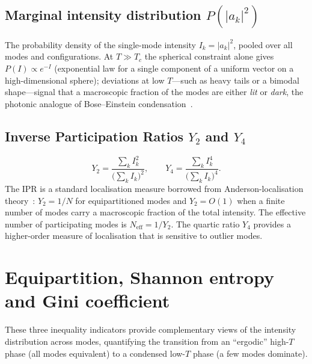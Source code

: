 \documentclass[11pt,a4paper]{article}
\begin{document}
\subsection{Marginal intensity distribution $P(|a_k|^2)$}
The probability density of the single-mode intensity $I_k = |a_k|^2$,
pooled over all modes and configurations.
At $T \gg T_c$ the spherical constraint alone gives
$P(I) \propto e^{-I}$ (exponential law for a single component of
a uniform vector on a high-dimensional sphere); deviations at
low $T$---such as heavy tails or a bimodal shape---signal that
a macroscopic fraction of the modes are either \emph{lit} or
\emph{dark}, the photonic analogue of Bose--Einstein
condensation~\cite{Antenucci2015a}.

\subsection{Inverse Participation Ratios $Y_2$ and $Y_4$}
\begin{equation}
  Y_2 = \frac{\sum_k I_k^2}{\bigl(\sum_k I_k\bigr)^2},
  \qquad
  Y_4 = \frac{\sum_k I_k^4}{\bigl(\sum_k I_k\bigr)^4}.
\end{equation}
The IPR is a standard localisation measure borrowed from
Anderson-localisation theory~\cite{Anderson1958}: $Y_2 = 1/N$
for equipartitioned modes and $Y_2 = O(1)$ when a finite
number of modes carry a macroscopic fraction of the total
intensity.  The effective number of participating modes is
$N_{\mathrm{eff}} = 1/Y_2$.  The quartic ratio $Y_4$ provides
a higher-order measure of localisation that is sensitive to
outlier modes.

\section{Equipartition, Shannon entropy and Gini coefficient}

These three inequality indicators provide complementary views
of the intensity distribution across modes, quantifying the
transition from an ``ergodic'' high-$T$ phase (all modes
equivalent) to a condensed low-$T$ phase (a few modes dominate).

\end{document}
